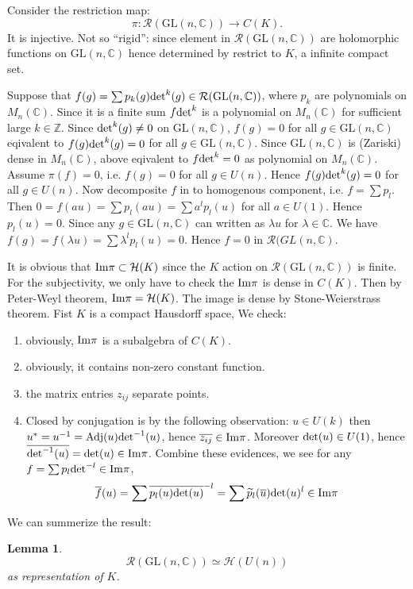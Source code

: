 \documentclass[12pt]{article}
\newtheorem{lemma}{Lemma}
\def\Im{{\rm Im}}
\def\bZ{{\mathbb{Z}}}
\def\bC{{\mathbb{C}}}
\def\det{{\rm det}}
\def\chh{\mathcal{H}}
\def\crr{\mathcal{R}}
\def\GL{\mathrm{GL}}
\begin{document}
Consider the restriction map:
\[
\pi:\crr(\GL(n,\bC)) \to C(K).
\]
It is injective.
Not so ``rigid'': since element in $\crr(\GL(n,\bC))$ are holomorphic functions
on $\GL(n,\bC)$ hence determined by restrict to $K$, a infinite compact set. 

Suppose that $f(g) = \sum p_k(g) \det^k(g) \in \crr(\GL(n,\bC))$, where
$p_k$ are polynomials on $M_n(\bC)$. Since it is a 
finite sum $f\det^k$ is a polynomial on $M_n(\bC)$ 
for sufficient large $k\in \bZ$.
Since  $\det^k(g)\neq 0$ on $\GL(n,\bC)$,
$f(g) = 0$ for all $g\in \GL(n,\bC)$ eqivalent to $f(g)\det^k(g) = 0$
for all $g\in \GL(n,\bC)$. 
Since $\GL(n,\bC)$ is (Zariski) dense in $M_n(\bC)$, above eqivalent to 
$f\det^k=0$ as polynomial on $M_n(\bC)$. 
Assume $\pi(f)=0$, i.e. $f(g) = 0$ for all $g\in U(n)$. Hence 
$f(g)\det^k(g)=0$ for all $g\in U(n)$. 
Now decomposite $f$ in to homogenous component, i.e. $f=\sum p_l$. 
Then $0=f(au)=\sum p_l(au) =\sum a^l p_l(u)$ for all $a\in U(1)$. Hence
$p_l(u) =0$. Since any $g\in \GL(n,\bC)$ can written as $\lambda u$ for 
$\lambda \in \bC$. We have $f(g) = f(\lambda u) = \sum \lambda^l p_l(u) = 0$. 
Hence $f=0$ in $\crr(GL(n,\bC)$.

It is obvious that $\Im \pi \subset \chh(K)$
 since the $K$ action on $\crr(\GL(n,\bC))$ is finite. 
For the subjectivity, we only have to check the $\Im \pi$ is dense in $C(K)$. 
Then by Peter-Weyl theorem, $\Im \pi=\chh(K)$. 
The image is dense by Stone-Weierstrass theorem. 
Fist $K$ is a compact Hausdorff space, 
We check:
\begin{enumerate}[(1)]
\item obviously, $\Im \pi$ is a subalgebra of $C(K)$.
\item obviously, it contains non-zero constant function.
\item the matrix entries $z_{ij}$ separate points.
\item Closed by conjugation is by the following observation: 
$u\in U(k)$ then $u^* = u^{-1} = {\rm Adj}(u) \det^{-1}(u)$, hence 
$\overline{z_{ij}} \in \Im\pi$. Moreover $\det(u)\in U(1)$, hence
$\overline{\det^{-1}(u)} = \det(u) \in \Im\pi$.
Combine these evidences, we see for any $f = \sum p_l \det^{-l} \in \Im \pi$,
\[
\overline{f}(u) = \sum \overline{p_l(u)}\overline{\det(u)}^{-l}
= \sum \widetilde{p}_l(\overline{u})\det(u)^l \in \Im \pi
\]  
\end{enumerate}

We can summerize the result:

\begin{lemma}
\[
\crr(\GL(n,\bC)) \simeq \chh(U(n))
\]
as representation of $K$. 
\end{lemma}
\end{document}
